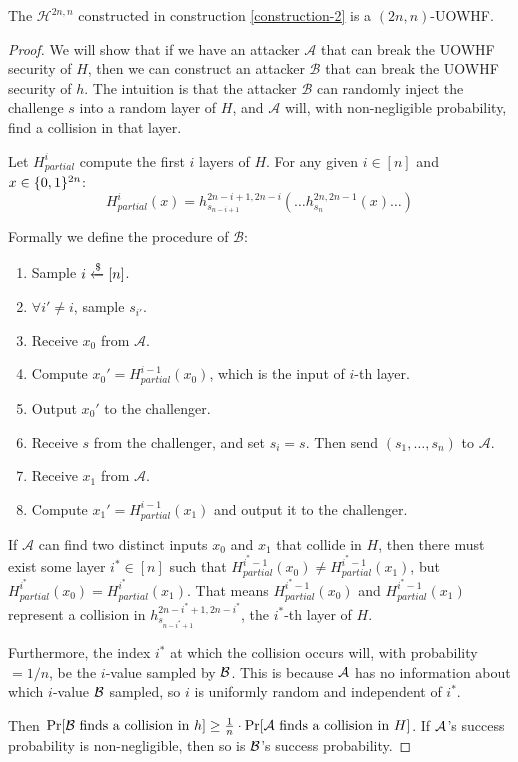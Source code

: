 \begin{claim}
    The $\mathcal{H}^{2n, n}$ constructed in construction \ref{construction-2} is a $(2n, n)$-UOWHF.
\end{claim}
\begin{proof}
    We will show that if we have an attacker $\mathcal{A}$ that can break the UOWHF security of $H$, then we can construct an attacker $\mathcal{B}$ that can break the UOWHF security of $h$. The intuition is that the attacker $\mathcal{B}$ can randomly inject the challenge $s$ into a random layer of $H$, and $\mathcal{A}$ will, with non-negligible probability, find a collision in that layer.

    Let $H_{partial}^i$ compute the first $i$ layers of $H$. For any given $i \in [n]$ and $x \in \{0,1\}^{2n}$:
    \[H_{partial}^i(x) = h_{s_{n-i+1}}^{2n-i+1, 2n-i}( \dots h_{s_n}^{2n, 2n-1}(x) \dots )\]

    Formally we define the procedure of $\mathcal{B}$:
    \begin{enumerate}
        \item Sample $i \xleftarrow{\$} [n]$.
        \item $\forall i'\neq i$, sample $s_{i'}$.
        \item Receive $x_0$ from $\mathcal{A}$.
        \item Compute $x_0' = H_{partial}^{i-1}(x_0)$, which is the input of $i$-th layer.
        \item Output $x_0'$ to the challenger.
        \item Receive $s$ from the challenger, and set $s_i = s$. Then send $(s_1,\dots,s_n)$ to $\mathcal{A}$.
        \item Receive $x_1$ from $\mathcal{A}$.
        \item Compute $x_1' = H_{partial}^{i-1}(x_1)$ and output it to the challenger.
    \end{enumerate}

If $\mathcal{A}$ can find two distinct inputs $x_0$ and $x_1$ that collide in $H$, then there must exist some layer $i^* \in [n]$ such that $H_{partial}^{i^*-1}(x_0) \neq H_{partial}^{i^*-1}(x_1)$, but $H_{partial}^{i^*}(x_0) = H_{partial}^{i^*}(x_1)$. That means $H_{partial}^{i^*-1}(x_0)$ and $H_{partial}^{i^*-1}(x_1)$ represent a collision in $h_{s_{n-i^*+1}}^{2n-i^*+1, 2n-i^*}$, the $i^*$-th layer of $H$. 

Furthermore, the index $i^*$ at which the collision occurs will, with probability $= 1/n$, be the $i$-value sampled by $\mathcal{B}$. This is because $\mathcal{A}$ has no information about which $i$-value $\mathcal{B}$ sampled, so $i$ is uniformly random and independent of $i^*$.

Then $\Pr[\mathcal{B} \text{ finds a collision in } h] \geq \frac{1}{n} \cdot \Pr[\mathcal{A} \text{ finds a collision in } H]$. If $\mathcal{A}$'s success probability is non-negligible, then so is $\mathcal{B}$'s success probability. 
\end{proof}
\vspace{5mm}

